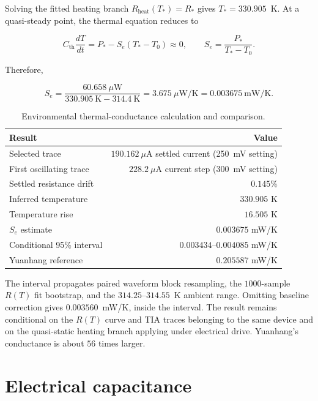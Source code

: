 \documentclass[11pt]{article}
\begin{document}
Solving the fitted heating branch $R_{\mathrm{heat}}(T_*)=R_*$ gives $T_*=330.905$~K. At a quasi-steady point, the thermal equation reduces to

\begin{equation}
C_{\mathrm{th}}\frac{dT}{dt}=P_*-S_e(T_*-T_0)\approx0,
\qquad
S_e=\frac{P_*}{T_*-T_0}.
\end{equation}

Therefore,

\begin{equation}
S_e=\frac{60.658~\mu\mathrm{W}}{330.905~\mathrm{K}-314.4~\mathrm{K}}
=3.675~\mu\mathrm{W/K}
=0.003675~\mathrm{mW/K}.
\label{eq:sample_conductance}
\end{equation}

\begin{table}[H]
\centering
\small
{}
\begin{tabular}{@{}l r@{}}
\toprule
Result & Value \\
\midrule
Selected trace & $190.162~\mu$A settled current (250~mV setting) \\
First oscillating trace & $228.2~\mu$A current step (300~mV setting) \\
Settled resistance drift & $0.145\%$ \\
Inferred temperature & $330.905$ K \\
Temperature rise & $16.505$ K \\
$S_e$ estimate & $0.003675$ mW/K \\
Conditional 95\% interval & $0.003434$--$0.004085$ mW/K \\
Yuanhang reference & $0.205587$ mW/K \\
\bottomrule
\end{tabular}
\caption{Environmental thermal-conductance calculation and comparison.}
\label{tab:conductance_result}
\end{table}

The interval propagates paired waveform block resampling, the $1000$-sample $R(T)$ fit bootstrap, and the $314.25$--$314.55$~K ambient range. Omitting baseline correction gives $0.003560$~mW/K, inside the interval. The result remains conditional on the $R(T)$ curve and TIA traces belonging to the same device and on the quasi-static heating branch applying under electrical drive. Yuanhang's conductance is about $56$ times larger.

\section{Electrical capacitance}
\label{sec:electrical_capacitance}
\end{document}
